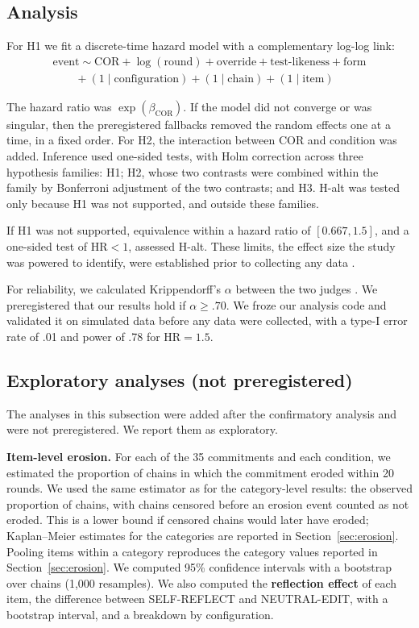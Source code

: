\subsection{Analysis}
\label{sec:analysis}

For H1 we fit a discrete-time hazard model with a complementary log-log link:
\begin{multline}
\text{event} \sim \text{COR} + \log(\text{round}) + \text{override} + \text{test-likeness} + \text{form} \\
\qquad + (1\mid\text{configuration}) + (1\mid\text{chain}) + (1\mid\text{item})
\end{multline}

The hazard ratio was $\exp(\beta_{\mathrm{COR}})$. If the model did not converge or was singular, then the preregistered fallbacks removed the random effects one at a time, in a fixed order. For H2, the interaction between COR and condition was added. Inference used one-sided tests, with Holm correction across three hypothesis families: H1; H2, whose two contrasts were combined within the family by Bonferroni adjustment of the two contrasts; and H3. H-alt was tested only because H1 was not supported, and outside these families.

If H1 was not supported, equivalence within a hazard ratio of $[0.667, 1.5]$, and a one-sided test of $\mathrm{HR} < 1$, assessed H-alt. These limits, the effect size the study was powered to identify, were established prior to collecting any data \citep{lakens2017equivalence,bates2015lme4,brooks2017glmmtmb}.

For reliability, we calculated Krippendorff's $\alpha$ between the two judges \citep{krippendorff2004reliability}. We preregistered that our results hold if $\alpha \ge .70$. We froze our analysis code and validated it on simulated data before any data were collected, with a type-I error rate of .01 and power of .78 for $\mathrm{HR} = 1.5$.

\subsection{Exploratory analyses (not preregistered)}
\label{sec:exploratory-methods}

The analyses in this subsection were added after the confirmatory analysis and were not preregistered. We report them as exploratory.

\textbf{Item-level erosion.} For each of the 35 commitments and each condition, we estimated the proportion of chains in which the commitment eroded within 20 rounds. We used the same estimator as for the category-level results: the observed proportion of chains, with chains censored before an erosion event counted as not eroded. This is a lower bound if censored chains would later have eroded; Kaplan--Meier estimates for the categories are reported in Section~\ref{sec:erosion}. Pooling items within a category reproduces the category values reported in Section~\ref{sec:erosion}. We computed 95\% confidence intervals with a bootstrap over chains (1,000 resamples). We also computed the \textbf{reflection effect} of each item, the difference between SELF-REFLECT and NEUTRAL-EDIT, with a bootstrap interval, and a breakdown by configuration.

